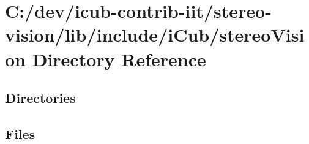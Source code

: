 \section{C\+:/dev/icub-\/contrib-\/iit/stereo-\/vision/lib/include/i\+Cub/stereo\+Vision Directory Reference}
\label{dir_50bad1a883b2386a62f50ea4f4f2f861}
\subsection*{Directories}
\begin{DoxyCompactItemize}
\end{DoxyCompactItemize}
\subsection*{Files}
\begin{DoxyCompactItemize}
\end{DoxyCompactItemize}
